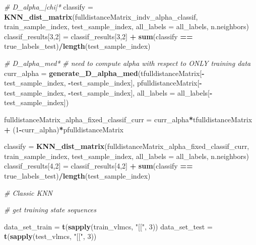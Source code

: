 \documentclass[
]{article}
\newenvironment{Shaded}{\begin{snugshade}}{\end{snugshade}}
\newcommand{\AttributeTok}[1]{\textcolor[rgb]{0.13,0.29,0.53}{#1}}
\newcommand{\CommentTok}[1]{\textcolor[rgb]{0.56,0.35,0.01}{\textit{#1}}}
\newcommand{\DecValTok}[1]{\textcolor[rgb]{0.00,0.00,0.81}{#1}}
\newcommand{\FunctionTok}[1]{\textcolor[rgb]{0.13,0.29,0.53}{\textbf{#1}}}
\newcommand{\NormalTok}[1]{#1}
\newcommand{\OtherTok}[1]{\textcolor[rgb]{0.56,0.35,0.01}{#1}}
\newcommand{\SpecialCharTok}[1]{\textcolor[rgb]{0.81,0.36,0.00}{\textbf{#1}}}
\newcommand{\StringTok}[1]{\textcolor[rgb]{0.31,0.60,0.02}{#1}}
\begin{document}
\begin{Shaded}
\begin{Highlighting}[]
  \CommentTok{\# D\_alpha\_|chi|*}
\NormalTok{  classify }\OtherTok{=} \FunctionTok{KNN\_dist\_matrix}\NormalTok{(fulldistanceMatrix\_indv\_alpha\_classif, train\_sample\_index, test\_sample\_index, }\AttributeTok{all\_labels =}\NormalTok{ all\_labels, n.neighbors)}
\NormalTok{  classif\_results[}\DecValTok{3}\NormalTok{,}\DecValTok{2}\NormalTok{] }\OtherTok{=}\NormalTok{ classif\_results[}\DecValTok{3}\NormalTok{,}\DecValTok{2}\NormalTok{] }\SpecialCharTok{+} \FunctionTok{sum}\NormalTok{(classify }\SpecialCharTok{==}\NormalTok{ true\_labels\_test)}\SpecialCharTok{/}\FunctionTok{length}\NormalTok{(test\_sample\_index)}
  
  \CommentTok{\# D\_alpha\_med*}
  \CommentTok{\# need to compute alpha with respect to ONLY training data}
\NormalTok{  curr\_alpha }\OtherTok{=} \FunctionTok{generate\_D\_alpha\_med}\NormalTok{(tfulldistanceMatrix[}\SpecialCharTok{{-}}\NormalTok{test\_sample\_index, }\SpecialCharTok{{-}}\NormalTok{test\_sample\_index], }
\NormalTok{                                    pfulldistanceMatrix[}\SpecialCharTok{{-}}\NormalTok{test\_sample\_index, }\SpecialCharTok{{-}}\NormalTok{test\_sample\_index], }
                                    \AttributeTok{all\_labels =}\NormalTok{ all\_labels[}\SpecialCharTok{{-}}\NormalTok{test\_sample\_index])}
  
\NormalTok{  fulldistanceMatrix\_alpha\_fixed\_classif\_curr }\OtherTok{=}\NormalTok{ curr\_alpha}\SpecialCharTok{*}\NormalTok{tfulldistanceMatrix }\SpecialCharTok{+}\NormalTok{ (}\DecValTok{1}\SpecialCharTok{{-}}\NormalTok{curr\_alpha)}\SpecialCharTok{*}\NormalTok{pfulldistanceMatrix}
  
\NormalTok{  classify }\OtherTok{=} \FunctionTok{KNN\_dist\_matrix}\NormalTok{(fulldistanceMatrix\_alpha\_fixed\_classif\_curr, train\_sample\_index, test\_sample\_index, }\AttributeTok{all\_labels =}\NormalTok{ all\_labels, n.neighbors)}
\NormalTok{  classif\_results[}\DecValTok{4}\NormalTok{,}\DecValTok{2}\NormalTok{] }\OtherTok{=}\NormalTok{ classif\_results[}\DecValTok{4}\NormalTok{,}\DecValTok{2}\NormalTok{] }\SpecialCharTok{+} \FunctionTok{sum}\NormalTok{(classify }\SpecialCharTok{==}\NormalTok{ true\_labels\_test)}\SpecialCharTok{/}\FunctionTok{length}\NormalTok{(test\_sample\_index)}
  
  \CommentTok{\# Classic KNN }
  
  \CommentTok{\# get training state sequences }
  
\NormalTok{  data\_set\_train }\OtherTok{=} \FunctionTok{t}\NormalTok{(}\FunctionTok{sapply}\NormalTok{(train\_vlmcs, }\StringTok{"[["}\NormalTok{, }\DecValTok{3}\NormalTok{))}
\NormalTok{  data\_set\_test }\OtherTok{=} \FunctionTok{t}\NormalTok{(}\FunctionTok{sapply}\NormalTok{(test\_vlmcs, }\StringTok{"[["}\NormalTok{, }\DecValTok{3}\NormalTok{))}
  

\end{Highlighting}
\end{Shaded}
\end{document}
